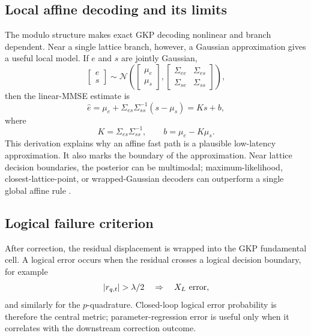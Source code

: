 \documentclass[11pt]{article}
\begin{document}
\subsection{Local affine decoding and its limits}

The modulo structure makes exact GKP decoding nonlinear and branch dependent.
Near a single lattice branch, however, a Gaussian approximation gives a useful
local model.  If \(e\) and \(s\) are jointly Gaussian,
\begin{equation}
\begin{bmatrix}e\\s\end{bmatrix}
\sim
\mathcal{N}
\left(
\begin{bmatrix}\mu_e\\\mu_s\end{bmatrix},
\begin{bmatrix}
\Sigma_{ee} & \Sigma_{es}\\
\Sigma_{se} & \Sigma_{ss}
\end{bmatrix}
\right),
\end{equation}
then the linear-MMSE estimate is
\begin{equation}
    \hat e=\mu_e+\Sigma_{es}\Sigma_{ss}^{-1}(s-\mu_s)=Ks+b,
\end{equation}
where
\begin{equation}
    K=\Sigma_{es}\Sigma_{ss}^{-1},
    \qquad
    b=\mu_e-K\mu_s.
\end{equation}
This derivation explains why an affine fast path is a plausible low-latency
approximation.  It also marks the boundary of the approximation.  Near lattice
decision boundaries, the posterior can be multimodal; maximum-likelihood,
closest-lattice-point, or wrapped-Gaussian decoders can outperform a single
global affine rule \cite{fukui2018,roy2025}.

\subsection{Logical failure criterion}

After correction, the residual displacement is wrapped into the GKP
fundamental cell.  A logical error occurs when the residual crosses a logical
decision boundary, for example
\begin{equation}
    |r_{q,t}|>\lambda/2 \quad \Rightarrow \quad X_L\ {\rm error},
\end{equation}
and similarly for the \(p\)-quadrature.  Closed-loop logical error probability
is therefore the central metric; parameter-regression error is useful only when
it correlates with the downstream correction outcome.
\end{document}
